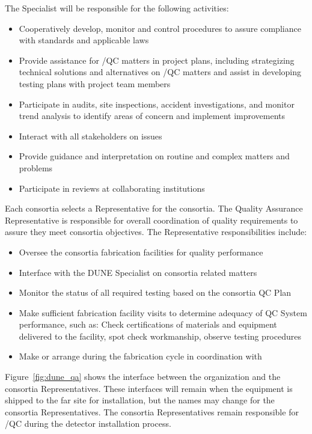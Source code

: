 The   Specialist will be responsible for the
following activities:
\begin{itemize}
	\item Cooperatively develop, monitor and control 
           procedures to assure compliance with 
          standards and applicable laws
     \item Provide assistance for /QC matters in project
       plans, including strategizing technical solutions and
       alternatives on /QC matters and assist in developing
       testing plans with project team members
	   \item Participate in audits, site inspections, accident
             investigations, and monitor trend analysis to identify
             areas of concern and implement improvements
	\item Interact with all stakeholders on  issues
      \item Provide guidance and interpretation on routine and complex
         matters and problems
	\item Participate in reviews at collaborating institutions
\end{itemize}

Each consortia selects a  Representative for the consortia.  The
Quality Assurance Representative is responsible for overall
coordination of quality requirements to assure they meet consortia
objectives.  The  Representative responsibilities include:
\begin{itemize}
  \item Oversee the consortia fabrication facilities for quality
    performance
  \item Interface with the DUNE  Specialist on consortia  related
    matters
  \item Monitor the status of all required testing based on the
    consortia QC Plan
  \item Make sufficient fabrication facility visits to determine
    adequacy of QC System performance, such as: Check certifications
    of materials and equipment delivered to the facility, spot check
    workmanship, observe testing procedures
  \item Make or arrange  during the fabrication cycle in
    coordination with 
\end{itemize}

Figure~\ref{fig:dune_qa} shows the interface between the
  organization and the consortia 
Representatives.
These interfaces will remain when the equipment is shipped to the far
site for installation, but the names may change for the consortia 
Representatives.  The consortia  Representatives remain responsible
for /QC during the detector installation process.


